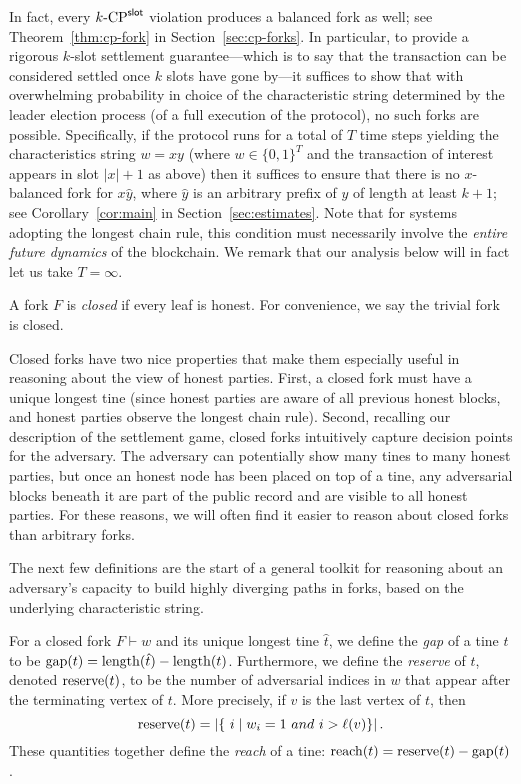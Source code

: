 In fact, every ${k}\text{-}\mathrm{CP}^{\mathsf{slot}}$ violation produces a balanced fork as well;
see Theorem~\ref{thm:cp-fork} in Section~\ref{sec:cp-forks}.  In
particular, to provide a rigorous $k$-slot settlement
guarantee---which is to say that the transaction can be considered
settled once $k$ slots have gone by---it suffices to show that with
overwhelming probability in choice of the characteristic string
determined by the leader election process (of a full execution of the
protocol), no such forks are possible. Specifically, if the protocol
runs for a total of $T$ time steps yielding the characteristics string
$w = xy$ (where $w \in \{0,1\}^T$ and the transaction of interest
appears in slot $|x| + 1$ as above) then it suffices to ensure that
there is no $x$-balanced fork for $x\hat{y}$, where $\hat{y}$ is an
arbitrary prefix of $y$ of length at least $k + 1$; see
Corollary~\ref{cor:main} in Section~\ref{sec:estimates}.  Note that
for systems adopting the longest chain rule, this condition must
necessarily involve the \emph{entire future dynamics} of the
blockchain. We remark that our analysis below will in fact let us take
$T = \infty$.

\begin{definition}
A fork $F$ is \emph{closed} if every leaf is honest. For convenience, we say the trivial fork is closed.
\end{definition}

Closed forks have two nice properties that make them especially useful in reasoning about the view of honest parties.
First, a closed fork must have a unique longest tine (since honest parties are aware of all previous honest blocks, and honest
parties observe the longest chain rule). Second, recalling our description of the
settlement game, closed forks intuitively capture decision points for the adversary.
The adversary can potentially show many tines to many honest parties, but once an honest node has been placed on top of 
a tine, any adversarial blocks beneath it are part of the public record and are visible to all honest parties. For these
reasons, we will often find it easier to reason about closed forks than arbitrary forks. %

The next few definitions are the start of a general toolkit for reasoning about an adversary's capacity to build highly diverging paths in forks, based on the underlying characteristic string.

\begin{definition}\label{def:gap-reserve-reach}
For a closed fork $F \vdash w$ and its unique longest tine $\hat{t}$, we define the \emph{gap} of a tine $t$ to be $\operatorname{gap}(t)=\operatorname{length}(\hat{t})-\operatorname{length}(t)$.
Furthermore, we define the \emph{reserve} of $t$, denoted $\operatorname{reserve}(t)$, to be the number of adversarial indices in $w$ that appear after the terminating vertex of $t$. More precisely, if $v$ is the last vertex of $t$, then
\[
  \reserve(t)=|\{\ i \mid w_i=1 \ and \ i > \ell(v)\}|\,.
  \]
These quantities together define the \emph{reach} of a tine: $
\operatorname{reach}(t)=\operatorname{reserve}(t)-\operatorname{gap}(t)$.
\end{definition}

